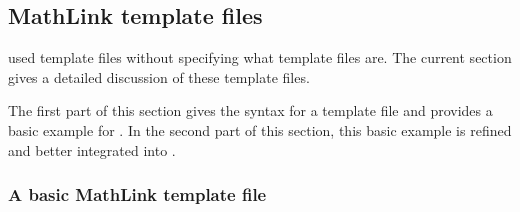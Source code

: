 \subsection{MathLink template files}

 used \MathLink template files without specifying what \MathLink template files are. The current section gives a detailed discussion of these template files.

The first part of this section gives the syntax for a \MathLink template file and provides a basic example for \exportedsymbol. In the second part of this section, this basic example is refined and better integrated into \Mathematica.

\subsubsection{A basic MathLink template file}


